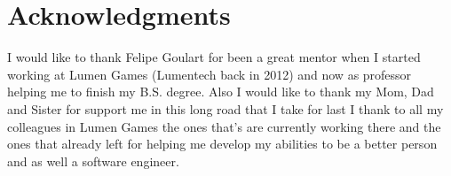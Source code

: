 \section*{Acknowledgments}
I would like to thank Felipe Goulart for been a great mentor when I started working at Lumen Games (Lumentech back in 2012) and now as professor helping me to finish my B.S. degree. Also I would like to thank my Mom, Dad and Sister for support me in this long road that I take for last I thank to all my colleagues in Lumen Games the ones that's are currently working there and the ones that already left for helping me develop my abilities to be a better person and as well a software engineer.